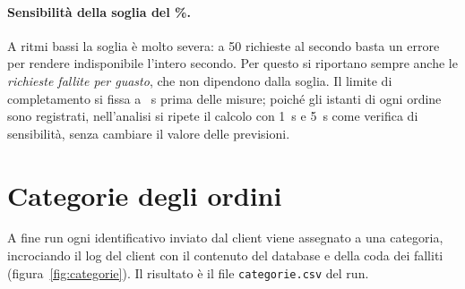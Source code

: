 \paragraph{Sensibilità della soglia del \%.} A ritmi bassi la soglia è molto severa: a 50 richieste al secondo basta un errore per rendere indisponibile l'intero secondo. Per questo si riportano sempre anche le \emph{richieste fallite per guasto}, che non dipendono dalla soglia. Il limite di completamento si fissa a ~s prima delle misure; poiché gli istanti di ogni ordine sono registrati, nell'analisi si ripete il calcolo con 1~s e 5~s come verifica di sensibilità, senza cambiare il valore delle previsioni.

\section{Categorie degli ordini}
\label{sec:categorie}

A fine run ogni identificativo inviato dal client viene assegnato a una categoria, incrociando il log del client con il contenuto del database e della coda dei falliti (figura~\ref{fig:categorie}). Il risultato è il file \texttt{categorie.csv} del run.

